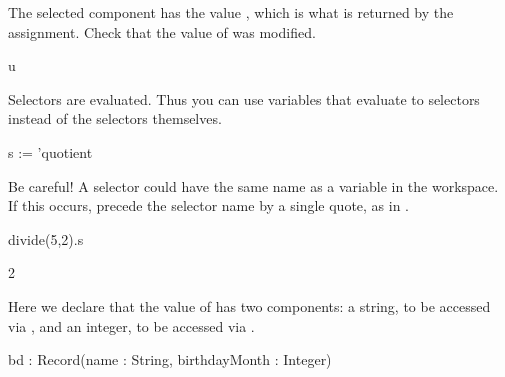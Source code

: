 \begin{xtc}
\begin{xtccomment}
The selected component  has the value ,
which is what is returned by the assignment.
Check that the value of  was modified.
\end{xtccomment}
\begin{spadsrc}
u 
\end{spadsrc}
\begin{TeXOutput}
\begin{fricasmath}{5}
%
\end{fricasmath}
\end{TeXOutput}
\end{xtc}
\begin{xtc}
\begin{xtccomment}
Selectors are evaluated.
Thus you can use variables that evaluate to selectors instead of the
selectors themselves.
\end{xtccomment}
\begin{spadsrc}
s := 'quotient 
\end{spadsrc}
\begin{TeXOutput}
\begin{fricasmath}{6}
%
\end{fricasmath}
\end{TeXOutput}
\end{xtc}
\begin{xtc}
\begin{xtccomment}
Be careful!
A selector could have the same name as a variable in the workspace.
If this occurs, precede the selector name by a single quote, as in
.
\end{xtccomment}
\begin{spadsrc}
divide(5,2).s 
\end{spadsrc}
\begin{TeXOutput}
\begin{fricasmath}{7}
2%
\end{fricasmath}
\end{TeXOutput}
\end{xtc}
\begin{xtc}
\begin{xtccomment}
Here we declare that the value of 
has two components: a string,
to be accessed via , and an integer,
to be accessed via .
\end{xtccomment}
\begin{spadsrc}
bd : Record(name : String, birthdayMonth : Integer) 
\end{spadsrc}
\end{xtc}
